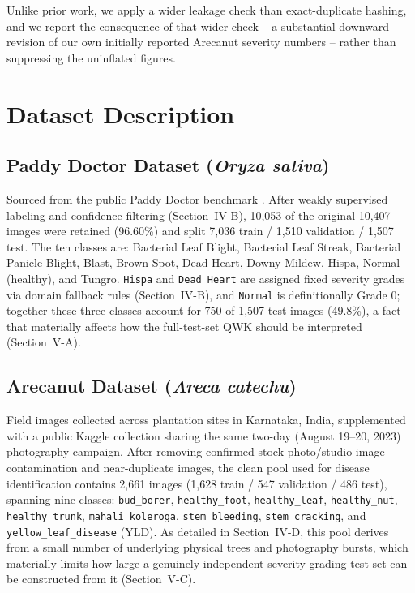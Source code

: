\documentclass[conference]{IEEEtran}
\begin{document}
Unlike prior work, we apply a wider leakage check than exact-duplicate hashing, and we report the consequence of that wider check -- a substantial downward revision of our own initially reported Arecanut severity numbers -- rather than suppressing the uninflated figures.

\section{Dataset Description}

\subsection{Paddy Doctor Dataset (\textit{Oryza sativa})}
Sourced from the public Paddy Doctor benchmark \cite{petchiammal2023paddy}. After weakly supervised labeling and confidence filtering (Section~IV-B), 10,053 of the original 10,407 images were retained (96.60\%) and split 7,036 train / 1,510 validation / 1,507 test. The ten classes are: Bacterial Leaf Blight, Bacterial Leaf Streak, Bacterial Panicle Blight, Blast, Brown Spot, Dead Heart, Downy Mildew, Hispa, Normal (healthy), and Tungro. \texttt{Hispa} and \texttt{Dead Heart} are assigned fixed severity grades via domain fallback rules (Section~IV-B), and \texttt{Normal} is definitionally Grade 0; together these three classes account for 750 of 1,507 test images (49.8\%), a fact that materially affects how the full-test-set QWK should be interpreted (Section~V-A).

\subsection{Arecanut Dataset (\textit{Areca catechu})}
Field images collected across plantation sites in Karnataka, India, supplemented with a public Kaggle collection sharing the same two-day (August 19--20, 2023) photography campaign. After removing confirmed stock-photo/studio-image contamination and near-duplicate images, the clean pool used for disease identification contains 2,661 images (1,628 train / 547 validation / 486 test), spanning nine classes: \texttt{bud\_borer}, \texttt{healthy\_foot}, \texttt{healthy\_leaf}, \texttt{healthy\_nut}, \texttt{healthy\_trunk}, \texttt{mahali\_koleroga}, \texttt{stem\_bleeding}, \texttt{stem\_cracking}, and \texttt{yellow\_leaf\_disease} (YLD). As detailed in Section~IV-D, this pool derives from a small number of underlying physical trees and photography bursts, which materially limits how large a genuinely independent severity-grading test set can be constructed from it (Section~V-C).
\end{document}
